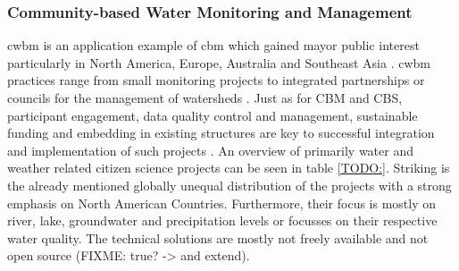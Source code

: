 {\subsubsection*{Community-based Water Monitoring and Management}

\acrfull*{cwbm} is an application example of \acrshort*{cbm} which gained mayor public interest particularly in North America, Europe, Australia and Southeast Asia \autocite{kirschkeCitizenScienceProjects2022, koehlerCitizenParticipationCollaborative2008, livinglakescanadaElevatingCommunityBased2018}. \acrshort*{cwbm} practices range from small monitoring projects to integrated partnerships or councils for the management of watersheds \autocite{westonCommunityBasedWaterMonitoring2015}. Just as for CBM and CBS, participant engagement, data quality control and management, sustainable funding and embedding in existing structures are key to successful integration and implementation of such projects \autocite{allenCommunityBasedWaterMonitoring2018,livinglakescanadaCommunityBasedWaterMonitoring2018,westonCommunityBasedWaterMonitoring2015}.
An overview of primarily water and weather related citizen science projects can be seen in table \ref*{TODO:}. Striking is the already mentioned globally unequal distribution of the projects with a strong emphasis on North American Countries. Furthermore, their focus is mostly on river, lake, groundwater and precipitation levels or focusses on their respective water quality. The technical solutions are mostly not freely available and not open source (FIXME: true? -> and extend). 


}
